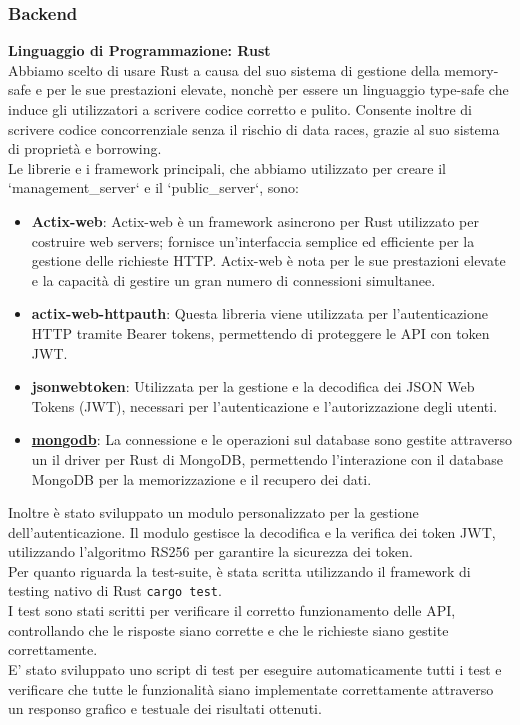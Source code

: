 \documentclass{article}
\begin{document}
\subsubsection{Backend}
\textbf{Linguaggio di Programmazione: Rust}\\
Abbiamo scelto di usare Rust a causa del suo sistema di gestione della memory-safe e per le sue prestazioni elevate, nonchè per essere un linguaggio type-safe che induce gli utilizzatori a scrivere codice corretto e pulito. Consente inoltre di scrivere codice concorrenziale senza il rischio di data races, grazie al suo sistema di proprietà e borrowing.\\
Le librerie e i framework principali, che abbiamo utilizzato per creare il `management\_server` e il  `public\_server`, sono:
\begin{itemize}
    \item \textbf{Actix-web}: Actix-web è un framework asincrono per Rust utilizzato per costruire web servers; fornisce un'interfaccia semplice ed efficiente per la gestione delle richieste HTTP. Actix-web è nota per le sue prestazioni elevate e la capacità di gestire un gran numero di connessioni simultanee.
    \item \textbf{actix-web-httpauth}: Questa libreria viene utilizzata per l'autenticazione HTTP tramite Bearer tokens, permettendo di proteggere le API con token JWT.
    \item \textbf{jsonwebtoken}: Utilizzata per la gestione e la decodifica dei JSON Web Tokens (JWT), necessari per l'autenticazione e l'autorizzazione degli utenti.
    \item \textbf{\href{https://www.mongodb.com/docs/drivers/rust/current/}{mongodb}}: La connessione e le operazioni sul database sono gestite attraverso un il driver per Rust di MongoDB, permettendo l'interazione con il database MongoDB per la memorizzazione e il recupero dei dati.
\end{itemize}
Inoltre è stato sviluppato un modulo personalizzato per la gestione dell'autenticazione. Il modulo gestisce la decodifica e la verifica dei token JWT, utilizzando l'algoritmo RS256 per garantire la sicurezza dei token.\\

Per quanto riguarda la test-suite, è stata scritta utilizzando il framework di testing nativo di Rust \texttt{cargo test}.\\
I test sono stati scritti per verificare il corretto funzionamento delle API, controllando che le risposte siano corrette e che le richieste siano gestite correttamente.\\
E' stato sviluppato uno script di test per eseguire automaticamente tutti i test e verificare che tutte le funzionalità siano implementate correttamente attraverso un responso grafico e testuale dei risultati ottenuti.
\end{document}
